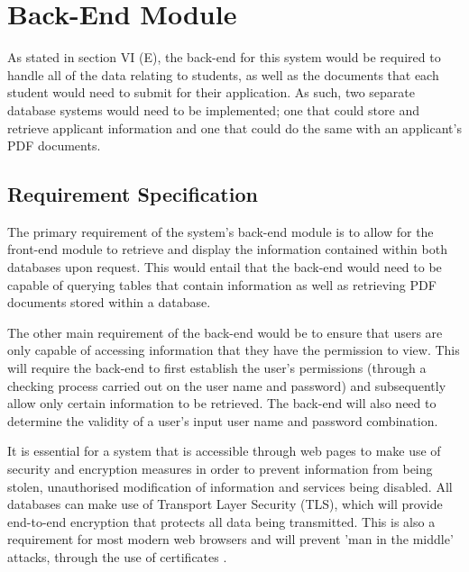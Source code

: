 \documentclass[journal]{IEEEtran}
\begin{document}
\section{Back-End Module}

As stated in section VI (E), the back-end for this system would be required to handle all of the data relating to students, as well as the documents that each student would need to submit for their application. As such, two separate database systems would need to be implemented; one that could store and retrieve applicant information and one that could do the same with an applicant's PDF documents.


\subsection{Requirement Specification}

The primary requirement of the system's back-end module is to allow for the front-end module to retrieve and display the information contained within both databases upon request. This would entail that the back-end would need to be capable of querying tables that contain information as well as retrieving PDF documents stored within a database.

\hfill \break The other main requirement of the back-end would be to ensure that users are only capable of accessing information that they have the permission to view. This will require the back-end to first establish the user's permissions (through a checking process carried out on the user name and password) and subsequently allow only certain information to be retrieved. The back-end will also need to determine the validity of a user's input user name and password combination.

\hfill \break It is essential for a system that is accessible through web pages to make use of security and encryption measures in order to prevent information from being stolen, unauthorised modification of information and services being disabled. All databases can make use of Transport Layer Security (TLS), which will provide end-to-end encryption that protects all data being transmitted. This is also a requirement for most modern web browsers and will prevent 'man in the middle' attacks, through the use of certificates \cite{tls}.

\end{document}
